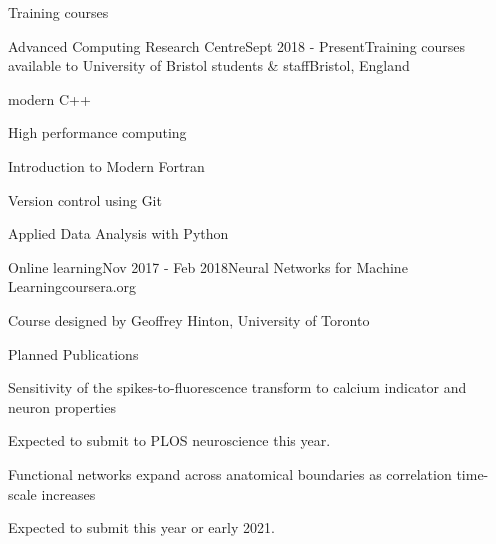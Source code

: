 \documentclass{resume} %
\begin{document}
\begin{rSection}{Training courses}
  \begin{rSubsection}{Advanced Computing Research Centre}{Sept 2018 - Present}{Training courses available to University of Bristol students \& staff}{Bristol, England}
    \item modern C++%
    \item High performance computing%
    \item Introduction to Modern Fortran
    \item Version control using Git
    \item Applied Data Analysis with Python
  \end{rSubsection}

  \begin{rSubsection}{Online learning}{Nov 2017 - Feb 2018}{Neural Networks for Machine Learning}{coursera.org}
    \item Course designed by Geoffrey Hinton, University of Toronto 
  \end{rSubsection}
\end{rSection}


\begin{rSection}{Planned Publications}
  \begin{rSubsection}{Sensitivity of the spikes-to-fluorescence transform to calcium indicator and neuron properties}{}{}{}
    \item Expected to submit to PLOS neuroscience this year.
  \end{rSubsection}

  \begin{rSubsection}{Functional networks expand across anatomical boundaries as correlation time-scale increases}{}{}{}
    \item Expected to submit this year or early 2021.
  \end{rSubsection}
\end{rSection}

\newpage
\end{document}
